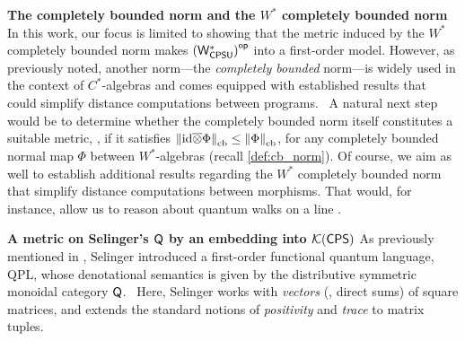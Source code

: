 \textbf{The completely bounded norm and the $W^*$ completely bounded norm}
In this work, our focus is limited to showing that the metric induced by the $W^*$ completely bounded norm makes $\left(\mathsf{W^*_{CPSU}}\right)^{\mathsf{op}}$ into a first-order model. However, as previously noted, another norm---the \emph{completely bounded} norm---is widely used in the context of $C^*$-algebras and comes equipped with established results that could simplify distance computations between programs.  A natural next step would be to determine whether the completely bounded norm itself constitutes a suitable metric, \ie, if it satisfies $\left\lVert \mathrm{id} \overline{\otimes} \Phi \right\rVert_{\text{cb}} \leq \left\lVert \Phi \right\rVert_{\text{cb}}$, for any completely bounded normal map $\Phi$ between $W^*$-algebras (recall \autoref{def:cb_norm}). Of course, we aim as well to establish additional results regarding the $W^*$ completely bounded norm that simplify distance computations between morphisms. That would, for instance, allow us to reason about quantum walks on a line \cite{venegasQuantumWalksComprehensive2012}.

\textbf{A metric on Selinger's $\mathsf{Q}$ by an embedding into $\mathcal{K}(\mathsf{CPS})$}
As previously mentioned in \cite{selinger2004towards}, Selinger introduced a first-order functional quantum language, QPL, whose denotational semantics is given by the distributive symmetric monoidal category $\mathsf{Q}$.  Here, Selinger works with \emph{vectors} (\ie, direct sums) of square matrices, and extends the standard notions of \emph{positivity} and \emph{trace} to matrix tuples.

